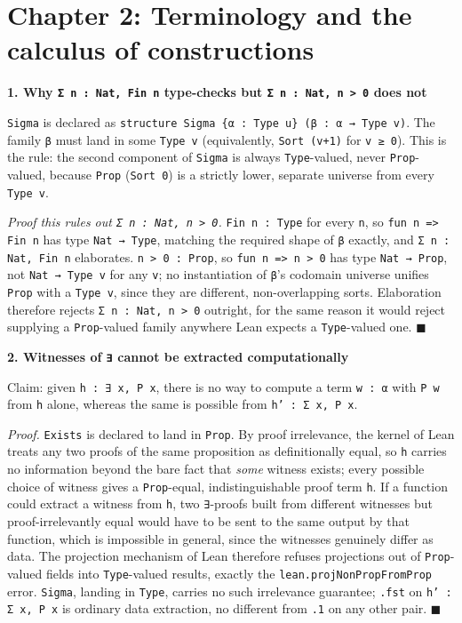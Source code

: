 \section{Chapter 2: Terminology and the calculus of constructions}\label{sec:15-appendix-solutions:02-chapter-2:1}

\textbf{1. Why \texttt{Σ n : Nat, Fin n} type-checks but \texttt{Σ n : Nat, n > 0} does not}

\texttt{Sigma} is declared as \texttt{structure Sigma \{α : Type u\} (β : α → Type v)}. The family \texttt{β} must land in some \texttt{Type v} (equivalently, \texttt{Sort (v+1)} for \texttt{v ≥ 0}). This is the rule: the second component of \texttt{Sigma} is always \texttt{Type}-valued, never \texttt{Prop}-valued, because \texttt{Prop} (\texttt{Sort 0}) is a strictly lower, separate universe from every \texttt{Type v}.

\emph{Proof this rules out \texttt{Σ n : Nat, n > 0}.} \texttt{Fin n : Type} for every \texttt{n}, so \texttt{fun n => Fin n} has type \texttt{Nat → Type}, matching the required shape of \texttt{β} exactly, and \texttt{Σ n : Nat, Fin n} elaborates. \texttt{n > 0 : Prop}, so \texttt{fun n => n > 0} has type \texttt{Nat → Prop}, not \texttt{Nat → Type v} for any \texttt{v}; no instantiation of \texttt{β}'s codomain universe unifies \texttt{Prop} with a \texttt{Type v}, since they are different, non-overlapping sorts. Elaboration therefore rejects \texttt{Σ n : Nat, n > 0} outright, for the same reason it would reject supplying a \texttt{Prop}-valued family anywhere Lean expects a \texttt{Type}-valued one. \(\blacksquare\)

\textbf{2. Witnesses of \texttt{∃} cannot be extracted computationally}

Claim: given \texttt{h : ∃ x, P x}, there is no way to compute a term \texttt{w : α} with \texttt{P w} from \texttt{h} alone, whereas the same is possible from \texttt{h' : Σ x, P x}.

\emph{Proof.} \texttt{Exists} is declared to land in \texttt{Prop}. By proof irrelevance, the kernel of Lean treats any two proofs of the same proposition as definitionally equal, so \texttt{h} carries no information beyond the bare fact that \emph{some} witness exists; every possible choice of witness gives a \texttt{Prop}-equal, indistinguishable proof term \texttt{h}. If a function could extract a witness from \texttt{h}, two \texttt{∃}-proofs built from different witnesses but proof-irrelevantly equal would have to be sent to the same output by that function, which is impossible in general, since the witnesses genuinely differ as data. The projection mechanism of Lean therefore refuses projections out of \texttt{Prop}-valued fields into \texttt{Type}-valued results, exactly the \texttt{lean.projNonPropFromProp} error. \texttt{Sigma}, landing in \texttt{Type}, carries no such irrelevance guarantee; \texttt{.fst} on \texttt{h' : Σ x, P x} is ordinary data extraction, no different from \texttt{.1} on any other pair. \(\blacksquare\)

